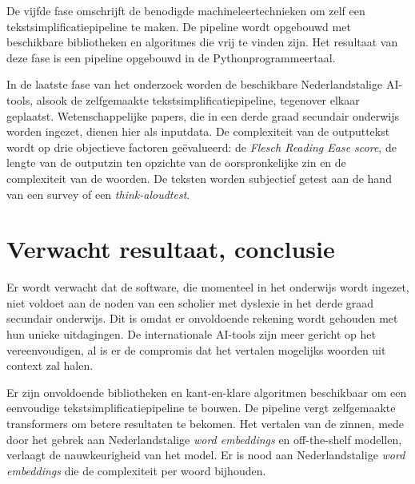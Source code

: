 De vijfde fase omschrijft de benodigde machineleertechnieken om zelf een tekstsimplificatiepipeline te maken. De pipeline wordt opgebouwd met beschikbare bibliotheken en algoritmes die vrij te vinden zijn. Het resultaat van deze fase is een pipeline opgebouwd in de Pythonprogrammeertaal. 


In de laatste fase van het onderzoek worden de beschikbare Nederlandstalige AI-tools, alsook de zelfgemaakte tekstsimplificatiepipeline, tegenover elkaar geplaatst. Wetenschappelijke papers, die in een derde graad secundair onderwijs worden ingezet, dienen hier als inputdata. De complexiteit van de outputtekst wordt op drie objectieve factoren geëvalueerd: de \textit{Flesch Reading Ease score}, de lengte van de outputzin ten opzichte van de oorspronkelijke zin en de complexiteit van de woorden. De teksten worden subjectief getest aan de hand van een survey of een \textit{think-aloudtest}.



\section{Verwacht resultaat, conclusie}
\label{sec:verwachte_resultaten}

Er wordt verwacht dat de software, die momenteel in het onderwijs wordt ingezet, niet voldoet aan de noden van een scholier met dyslexie in het derde graad secundair onderwijs. Dit is omdat er onvoldoende rekening wordt gehouden met hun unieke uitdagingen. De internationale AI-tools zijn meer gericht op het vereenvoudigen, al is er de compromis dat het vertalen mogelijks woorden uit context zal halen. 

Er zijn onvoldoende bibliotheken en kant-en-klare algoritmen beschikbaar om een eenvoudige tekstsimplificatiepipeline te bouwen. De pipeline vergt zelfgemaakte transformers om betere resultaten te bekomen. Het vertalen van de zinnen, mede door het gebrek aan Nederlandstalige \textit{word embeddings} en off-the-shelf modellen, verlaagt de nauwkeurigheid van het model. Er is nood aan Nederlandstalige \textit{word embeddings} die de complexiteit per woord bijhouden. 

